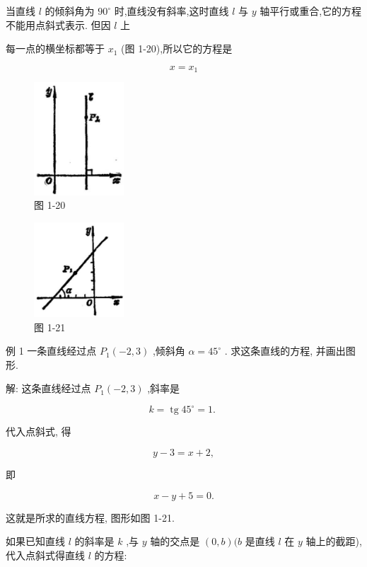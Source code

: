\documentclass[lang=cn,newtx,10pt,scheme=chinese]{elegantbook}
\begin{document}
当直线 \(l\) 的倾斜角为 \({90}^{ \circ }\) 时,直线没有斜率,这时直线 \(l\) 与 \(y\) 轴平行或重合,它的方程不能用点斜式表示. 但因 \(l\) 上

每一点的横坐标都等于 \({x}_{1}\) (图 1-20),所以它的方程是

\[
  x = {x}_{1}
\]

\begin{figure}[h]
  \centering
  \includegraphics[max width=0.3\textwidth]{images/01912cc2-ffb6-728e-9ae7-b113ff05c64b_24_697633.jpg}
  \caption{图 1-20}
\end{figure}


\begin{figure}[h]
  \centering
  \includegraphics[max width=0.3\textwidth]{images/01912cc2-ffb6-728e-9ae7-b113ff05c64b_24_594823.jpg}
  \caption{图 1-21}
\end{figure}


例 1 一条直线经过点 \({P}_{1}\left( {-2,3}\right)\) ,倾斜角 \(\alpha = {45}^{ \circ }\) . 求这条直线的方程, 并画出图形.

解: 这条直线经过点 \({P}_{1}\left( {-2,3}\right)\) ,斜率是

\[
  k = \operatorname{tg}{45}^{ \circ } = 1\text{. }
\]

代入点斜式, 得

\[
  y - 3 = x + 2,
\]

即

\[
  x - y + 5 = 0.
\]

这就是所求的直线方程, 图形如图 1-21.

如果已知直线 \(l\) 的斜率是 \(k\) ,与 \(y\) 轴的交点是 \(\left( {0,b}\right) (b\) 是直线 \(l\) 在 \(y\) 轴上的截距),代入点斜式得直线 \(l\) 的方程:
\end{document}
